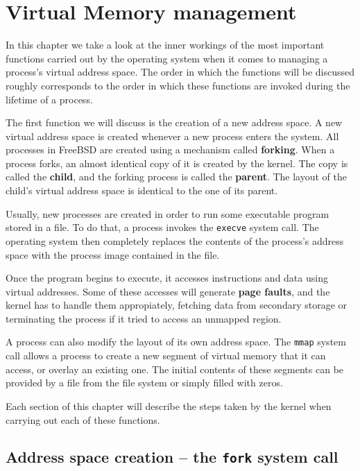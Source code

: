 \documentclass[shortabstract, english]{iithesis}
\begin{document}
\chapter{Virtual Memory management}

In this chapter we take a look at the inner workings of the most important
functions carried out by the operating system when it comes to managing a
process's virtual address space. The order in which the functions will be
discussed roughly corresponds to the order in which these functions are invoked
during the lifetime of a process.

The first function we will discuss is the creation of a new address space. A new
virtual address space is created whenever a new process enters the system. All
processes in FreeBSD are created using a mechanism called \textbf{forking}. When
a process forks, an almost identical copy of it is created by the kernel. The
copy is called the \textbf{child}, and the forking process is called the
\textbf{parent}. The layout of the child's virtual address space is identical to
the one of its parent.

Usually, new processes are created in order to run some executable program
stored in a file. To do that, a process invokes the \texttt{execve} system call.
The operating system then completely replaces the contents of the process's
address space with the process image contained in the file.

Once the program begins to execute, it accesses instructions and data using
virtual addresses. Some of these accesses will generate \textbf{page faults},
and the kernel has to handle them appropiately, fetching data from secondary
storage or terminating the process if it tried to access an unmapped region.

A process can also modify the layout of its own address space. The \texttt{mmap}
system call allows a process to create a new segment of virtual memory that it
can access, or overlay an existing one. The initial contents of these segments
can be provided by a file from the file system or simply filled with zeros.

Each section of this chapter will describe the steps taken by the kernel when
carrying out each of these functions.

\section{Address space creation -- the \texttt{fork} system call}
\end{document}
